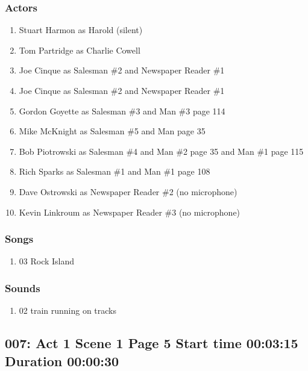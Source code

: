 \subsubsection{Actors}
\begin{enumerate}
\item Stuart Harmon as Harold (silent)
\item Tom Partridge as Charlie Cowell
\item Joe Cinque as Salesman \#2 and Newspaper Reader \#1
\item Joe Cinque as Salesman \#2 and Newspaper Reader \#1
\item Gordon Goyette as Salesman \#3 and Man \#3 page 114
\item Mike McKnight as Salesman \#5 and Man page 35
\item Bob Piotrowski as Salesman \#4 and Man \#2 page 35 and Man \#1 page 115
\item Rich Sparks as Salesman \#1 and Man \#1 page 108
\item Dave Ostrowski as Newspaper Reader \#2 (no microphone)
\item Kevin Linkroum as Newspaper Reader \#3 (no microphone)
\end{enumerate}

\subsubsection{Songs}
\begin{enumerate}
\item 03 Rock Island
\end{enumerate}\subsubsection{Sounds}
\begin{enumerate}
\item 02 train running on tracks
\end{enumerate}
\subsection{007: Act 1 Scene 1 Page 5 Start time 00:03:15 Duration 00:00:30}

